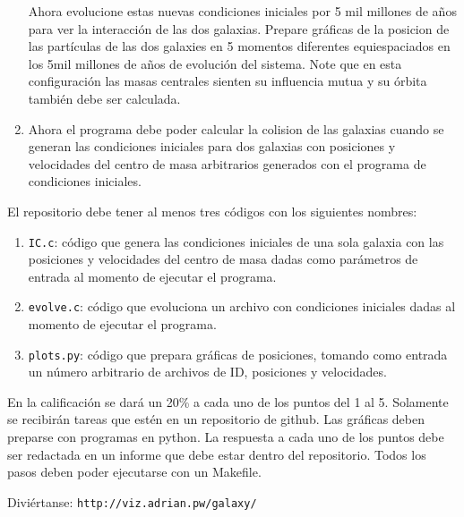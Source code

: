 \documentclass{article}
\begin{document}
\begin{enumerate}
  Ahora
  evolucione estas nuevas condiciones iniciales por 5 mil millones de
  a\~nos para ver la interacci\'on de las dos galaxias.  Prepare
  gr\'aficas de la posicion de las part\'iculas de las dos galaxies en
  5 momentos diferentes equiespaciados en los  5mil millones de a\~nos
  de evoluci\'on del sistema. 
  Note que en esta configuraci\'on las masas centrales sienten su
  influencia mutua y su \'orbita tambi\'en debe ser calculada.

\item
  Ahora el programa debe poder calcular la colision de las galaxias
  cuando se generan las condiciones iniciales para dos galaxias con
  posiciones y velocidades del centro de masa arbitrarios generados
  con el programa de condiciones iniciales.

\end{enumerate}

El repositorio debe tener al menos tres c\'odigos con los siguientes nombres:

\begin{enumerate}
\item \verb"IC.c": c\'odigo que genera las condiciones iniciales de
  una sola galaxia con las posiciones y velocidades del centro de masa
  dadas como par\'ametros de entrada al momento de ejecutar el programa.
\item \verb"evolve.c": c\'odigo que evoluciona un archivo con 
  condiciones iniciales dadas al momento de ejecutar el programa.
\item \verb"plots.py": c\'odigo que prepara gr\'aficas de
  posiciones, tomando como entrada un n\'umero
  arbitrario de archivos de ID, posiciones y velocidades.
\end{enumerate}


En la calificaci\'on se dar\'a un 20\% a cada uno de los puntos del 1
al 5. Solamente se recibir\'an tareas que est\'en en un repositorio de
github. Las gr\'aficas deben preparse con programas en python. La
respuesta a cada uno de los puntos debe ser redactada en un informe
que debe estar dentro del repositorio. Todos los pasos deben poder
ejecutarse con un Makefile.


Divi\'ertanse: \verb"http://viz.adrian.pw/galaxy/"
\end{document}
